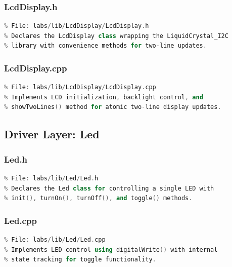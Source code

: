 \subsubsection{LcdDisplay.h}
\begin{lstlisting}[language=C++, caption=LcdDisplay.h --- LCD Display Driver Interface, label=lst:appendix_lcd_display_h]
% [Full source code - see GitHub repository]
% File: labs/lib/LcdDisplay/LcdDisplay.h
% Declares the LcdDisplay class wrapping the LiquidCrystal_I2C
% library with convenience methods for two-line updates.
\end{lstlisting}

\subsubsection{LcdDisplay.cpp}
\begin{lstlisting}[language=C++, caption=LcdDisplay.cpp --- LCD Display Driver Implementation, label=lst:appendix_lcd_display_cpp]
% [Full source code - see GitHub repository]
% File: labs/lib/LcdDisplay/LcdDisplay.cpp
% Implements LCD initialization, backlight control, and
% showTwoLines() method for atomic two-line display updates.
\end{lstlisting}

\subsection{Driver Layer: Led}

\subsubsection{Led.h}
\begin{lstlisting}[language=C++, caption=Led.h --- LED Driver Interface, label=lst:appendix_led_h]
% [Full source code - see GitHub repository]
% File: labs/lib/Led/Led.h
% Declares the Led class for controlling a single LED with
% init(), turnOn(), turnOff(), and toggle() methods.
\end{lstlisting}

\subsubsection{Led.cpp}
\begin{lstlisting}[language=C++, caption=Led.cpp --- LED Driver Implementation, label=lst:appendix_led_cpp]
% [Full source code - see GitHub repository]
% File: labs/lib/Led/Led.cpp
% Implements LED control using digitalWrite() with internal
% state tracking for toggle functionality.
\end{lstlisting}

